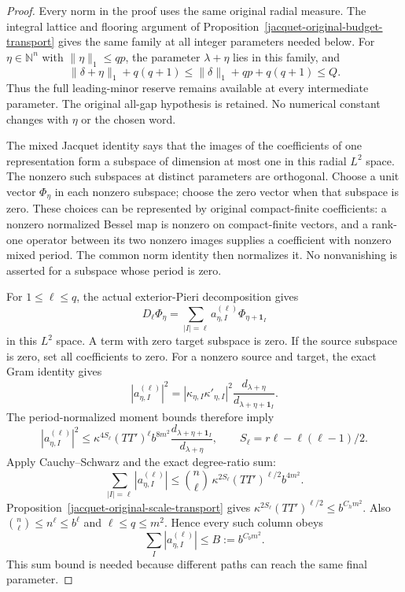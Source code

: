 \begin{proof}
Every norm in the proof uses the same original radial measure.
The integral lattice and flooring argument of
Proposition~\ref{jacquet-original-budget-transport} gives the
same family at all integer parameters needed below.
For $\eta\in\mathbb N^n$ with $\|\eta\|_1\le qp$, the parameter
$\lambda+\eta$ lies in this family, and
\[
 \|\delta+\eta\|_1+q(q+1)
 \le\|\delta\|_1+qp+q(q+1)\le Q.
\]
Thus the full leading-minor reserve remains available at every
intermediate parameter. The original all-gap hypothesis is retained.
No numerical constant changes with $\eta$ or the chosen word.

The mixed Jacquet identity says that the images of the coefficients
of one representation form a subspace of dimension at most one in
this radial $L^2$ space. The nonzero such subspaces at distinct
parameters are orthogonal. Choose a unit vector $\Phi_\eta$ in each
nonzero subspace; choose the zero vector when that subspace is zero.
These choices can be represented by original compact-finite
coefficients: a nonzero normalized Bessel map is nonzero on
compact-finite vectors, and a rank-one operator between its two
nonzero images supplies a coefficient with nonzero mixed period.
The common norm identity then normalizes it.
No nonvanishing is asserted for a subspace whose period is zero.

For $1\le\ell\le q$, the actual exterior-Pieri decomposition gives
\[
 D_\ell\Phi_\eta
    =\sum_{|I|=\ell}a_{\eta,I}^{(\ell)}
                          \Phi_{\eta+\mathbf1_I}
\]
in this $L^2$ space. A term with zero target subspace is zero.
If the source subspace is zero, set all coefficients to zero.
For a nonzero source and target, the exact Gram identity gives
\[
 |a_{\eta,I}^{(\ell)}|^2
   =|\kappa_{\eta,I}\kappa'_{\eta,I}|^2
                              \frac{d_{\lambda+\eta}}
                                   {d_{\lambda+\eta+\mathbf1_I}} .
\]
The period-normalized moment bounds therefore imply
\[
 |a_{\eta,I}^{(\ell)}|^2
 \le \kappa^{4S_\ell}(TT')^\ell b^{8m^2}
             \frac{d_{\lambda+\eta+\mathbf1_I}}
                  {d_{\lambda+\eta}},\qquad
 S_\ell=r\ell-\ell(\ell-1)/2.
\]
Apply Cauchy--Schwarz and the exact degree-ratio sum:
\[
 \sum_{|I|=\ell}|a_{\eta,I}^{(\ell)}|
 \le \binom n\ell\,\kappa^{2S_\ell}(TT')^{\ell/2}b^{4m^2}.
\]
Proposition~\ref{jacquet-original-scale-transport} gives
$\kappa^{2S_\ell}(TT')^{\ell/2}\le b^{C_hm^2}$.
Also $\binom n\ell\le n^\ell\le b^\ell$ and
$\ell\le q\le m^2$. Hence every such column obeys
\[
             \sum_I|a_{\eta,I}^{(\ell)}|
                       \le B:=b^{C_bm^2}.
\]
This sum bound is needed because different paths can reach the
same final parameter.


\end{proof}
